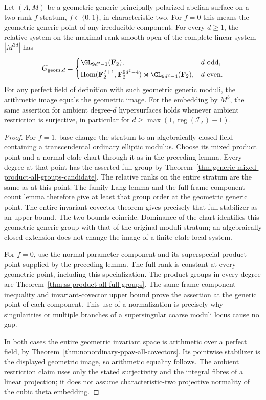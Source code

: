 \begin{theorem}
\label{thm:generic-nonordinary-ppav-groups-candidate}
Let $(A,M)$ be a geometric generic principally polarized
abelian surface on a two-rank-$f$ stratum, $f\in\{0,1\}$,
in characteristic two. For $f=0$ this means the geometric
generic point of any irreducible component.
For every $d\ge1$, the relative system on the maximal-rank
smooth open of the complete linear system $|M^{3d}|$ has
\[
 G_{\mathrm{geom},d}=
 \begin{cases}
 \GL_{9d^2-1}(\mathbf F_2),&d\text{ odd},\\[2pt]
 \operatorname{Hom}(\mathbf F_2^{f+1},\mathbf F_2^{9d^2-4})
       \rtimes\GL_{9d^2-4}(\mathbf F_2),&d\text{ even}.
 \end{cases}
\]
For any perfect field of definition with such geometric
generic moduli, the arithmetic image equals the geometric
image. For the embedding by $M^3$, the same assertion for
ambient degree-$d$ hypersurfaces holds whenever ambient
restriction is surjective, in particular for
$d\ge\max(1,\operatorname{reg}(\mathcal I_A)-1)$.
\end{theorem}

\begin{proof}
For $f=1$, base change the stratum to an algebraically
closed field containing a transcendental ordinary elliptic
modulus. Choose its mixed product point and a normal
etale chart through it as in the preceding lemma.
Every degree at that point has the asserted full group
by Theorem~\ref{thm:generic-mixed-product-all-groups-candidate}.
The relative ranks on the entire stratum are the same as
at this point. The family Lang lemma and the full frame
component-count lemma therefore give at least that group
order at the geometric generic point. The entire
invariant-covector theorem gives precisely that full
stabilizer as an upper bound. The two bounds coincide.
Dominance of the chart identifies this geometric generic
group with that of the original moduli stratum; an
algebraically closed extension does not change the image
of a finite etale local system.

For $f=0$, use the normal parameter component and its
superspecial product point supplied by the preceding
lemma. The full rank is constant at every geometric
point, including this specialization. The product groups
in every degree are Theorem~\ref{thm:ss-product-all-full-groups}.
The same frame-component inequality and invariant-covector
upper bound prove the assertion at the generic point of
each component. This use of a normalization is precisely
why singularities or multiple branches of a supersingular
coarse moduli locus cause no gap.

In both cases the entire geometric invariant space is
arithmetic over a perfect field, by
Theorem~\ref{thm:nonordinary-ppav-all-covectors}.
Its pointwise stabilizer is the displayed geometric image,
so arithmetic equality follows. The ambient restriction
claim uses only the stated surjectivity and the integral
fibres of a linear projection; it does not assume
characteristic-two projective normality of the cubic
theta embedding.
\end{proof}

